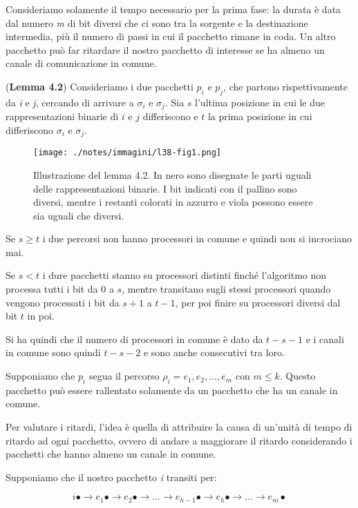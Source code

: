 Consideriamo solamente il tempo necessario per la prima fase: la durata è data dal numero \emph{m} di bit diversi che ci sono tra la sorgente e la destinazione intermedia, più il numero di passi in cui il pacchetto rimane in coda. 
Un altro pacchetto può far ritardare il nostro pacchetto di interesse se ha almeno un canale di comunicazione in comune.

(\textbf{Lemma 4.2}) Consideriamo i due pacchetti $p_i$ e $p_j$, che partono rispettivamente da \emph{i} e \emph{j}, cercando di arrivare a $\sigma_i$ e $\sigma_j$.
Sia $s$ l'ultima posizione in cui le due rappresentazioni binarie di $i$ e $j$ differiscono e $t$ la prima posizione in cui differiscono $\sigma_i$ e $\sigma_j$.

\begin{figure}[htbp]
	\centering
	\texttt{[image: ./notes/immagini/l38-fig1.png]}
	\caption{Illustrazione del lemma 4.2. In nero sono disegnate le parti uguali delle rappresentazioni binarie. I bit indicati con il pallino sono diversi, mentre i restanti colorati in azzurro e viola possono essere sia uguali che diversi.}
\end{figure}

Se $s \geq t$ i due percorsi non hanno processori in comune e quindi non si incrociano mai.

Se $s  < t$ i dure pacchetti stanno su processori distinti finché l'algoritmo non processa tutti i bit da $0$ a $s$, mentre transitano sugli stessi processori quando vengono processati i bit da $s+1$ a $t-1$, per poi finire su processori diversi dal bit $t$ in poi.

Si ha quindi che il numero di processori in comune è dato da $t - s - 1$ e i canali in comune sono quindi $t-s-2$ e sono anche consecutivi tra loro.

Supponiamo che $p_i$ segua il percorso $\rho_i = e_1, e_2, \ldots, e_m$ con $m \leq k$. 
Questo pacchetto può essere rallentato solamente da un pacchetto che ha un canale in comune.

Per valutare i ritardi, l'idea è quella di attribuire la causa di un'unità di tempo di ritardo ad ogni pacchetto, ovvero di andare a maggiorare il ritardo considerando i pacchetti che hanno almeno un canale in comune.

Supponiamo che il nostro pacchetto \emph{i} transiti per:

$$
i \bullet \rightarrow e_1 \bullet\rightarrow e_2\bullet \rightarrow \ldots \rightarrow e_{h-1} \bullet \rightarrow e_h \bullet \rightarrow \ldots \rightarrow e_{m}\bullet
$$

